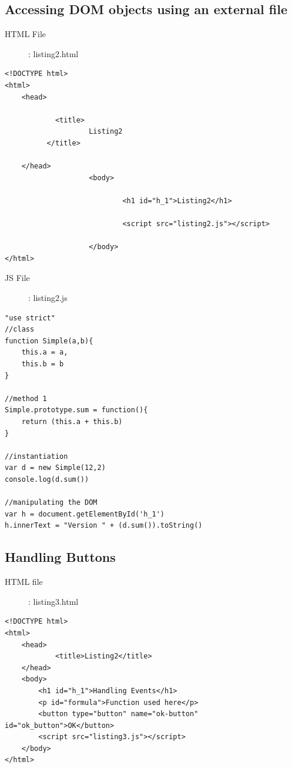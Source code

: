 \documentclass[10pt, a4paper, twocolumn]{article}
\begin{document}
\subsection{Accessing DOM objects using an external file}

\begin{description}
	\item[HTML File] : listing2.html
\end{description}
\begin{lstlisting}
<!DOCTYPE html>
<html>
	<head>

			<title>
					Listing2
		  </title>

	</head>
					<body>

							<h1 id="h_1">Listing2</h1>

							<script src="listing2.js"></script>

					</body>
</html>
\end{lstlisting}

\begin{description}
	\item[JS File] : listing2.js
\end{description}

\begin{lstlisting}
"use strict"
//class
function Simple(a,b){
	this.a = a,
	this.b = b
}

//method 1
Simple.prototype.sum = function(){
	return (this.a + this.b)
}

//instantiation
var d = new Simple(12,2)
console.log(d.sum())

//manipulating the DOM
var h = document.getElementById('h_1')
h.innerText = "Version " + (d.sum()).toString()
\end{lstlisting}

\subsection{Handling Buttons}

\begin{description}
	\item[HTML file] : listing3.html
\end{description}

\begin{lstlisting}
<!DOCTYPE html>
<html>
	<head>
			<title>Listing2</title>
	</head>
	<body>
		<h1 id="h_1">Handling Events</h1>
		<p id="formula">Function used here</p>
		<button type="button" name="ok-button" id="ok_button">OK</button>
		<script src="listing3.js"></script>
	</body>
</html>
\end{lstlisting}
\end{document}
